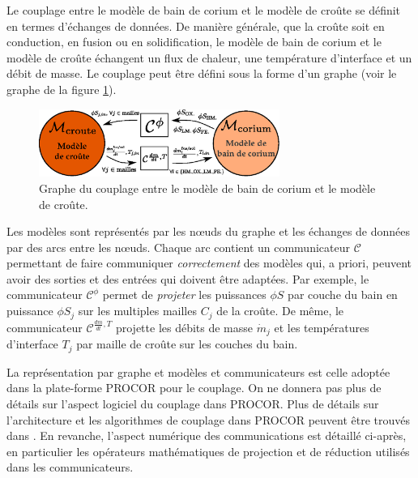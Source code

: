 Le couplage entre le modèle de bain de corium et le modèle de croûte se définit en termes d'échanges de données. De manière générale, que la croûte soit en conduction, en fusion ou en solidification, le modèle de bain de corium et le modèle de croûte échangent un flux de chaleur, une température d'interface et un débit de masse. Le couplage peut être défini sous la forme d'un graphe (voir le graphe de la figure \ref{fig:graphe_couplage_corium_croute}). 
\begin{figure}
\centering
\includegraphics[width=0.7\textwidth, keepaspectratio=true]{Figures/graphe_couplage_corium_croute.eps}
\caption{Graphe du couplage entre le modèle de bain de corium et le modèle de croûte.}
\label{fig:graphe_couplage_corium_croute}
\end{figure}
Les modèles sont représentés par les n\oe{}uds du graphe et les échanges de données par des arcs entre les n\oe{}uds. Chaque arc contient un communicateur $\mathcal{C}$ permettant de faire communiquer \emph{correctement} des modèles qui, a priori, peuvent avoir des sorties et des entrées qui doivent être adaptées. Par exemple, le communicateur $\mathcal{C}^{\phi}$ permet de \emph{projeter} les puissances $\phi S$ par couche du bain en puissance $\phi S_j$ sur les multiples mailles $C_j$ de la croûte. De même, le communicateur $\mathcal{C}^{\frac{dm}{dt}, T}$ projette les débits de masse $\dot{m}_j$ et les températures d'interface $T_j$ par maille de croûte sur les couches du bain. 

La représentation par graphe et modèles et communicateurs est celle adoptée dans la plate-forme PROCOR pour le couplage. On ne donnera pas plus de détails sur l'aspect logiciel du couplage dans PROCOR. Plus de détails sur l'architecture et les algorithmes de couplage dans PROCOR peuvent être trouvés dans \cite{Viot2018}. En revanche, l'aspect numérique des communications est détaillé ci-après, en particulier les opérateurs mathématiques de projection et de réduction utilisés dans les communicateurs.

